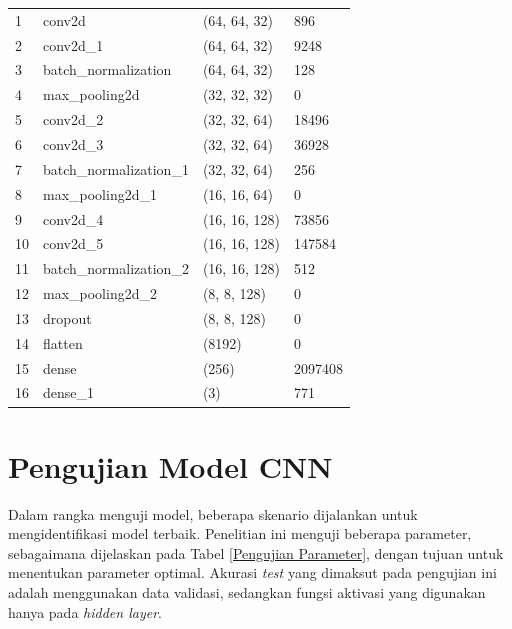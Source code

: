 \begin{table}[H]
\begin{table}[H]
\begin{tabular}{p{1cm}p{4.5cm}p{4cm}p{2.5cm}}
        1 & conv2d                   & (64, 64, 32)   & 896     \\ 
        2 & conv2d\_1                & (64, 64, 32)   & 9248    \\ 
        3 & batch\_normalization     & (64, 64, 32)   & 128     \\ 
        4 & max\_pooling2d           & (32, 32, 32)   & 0       \\ 
        5 & conv2d\_2                & (32, 32, 64)   & 18496   \\ 
        6 & conv2d\_3                & (32, 32, 64)   & 36928   \\ 
        7 & batch\_normalization\_1  & (32, 32, 64)   & 256     \\ 
        8 & max\_pooling2d\_1        & (16, 16, 64)   & 0       \\ 
        9 & conv2d\_4                & (16, 16, 128)  & 73856   \\ 
        10 & conv2d\_5                & (16, 16, 128)  & 147584  \\ 
        11 & batch\_normalization\_2  & (16, 16, 128)  & 512     \\ 
        12 & max\_pooling2d\_2        & (8, 8, 128)    & 0       \\ 
        13 & dropout                  & (8, 8, 128)    & 0       \\ 
        14 & flatten                  & (8192)         & 0       \\ 
        15 & dense                    & (256)          & 2097408 \\ 
        16 & dense\_1                 & (3)            & 771     \\ \hline
        \end{tabular}
    \end{table}





\section{Pengujian Model CNN}

    Dalam rangka menguji model, beberapa skenario dijalankan untuk mengidentifikasi model terbaik. Penelitian ini menguji beberapa parameter, sebagaimana dijelaskan pada Tabel \ref{Pengujian Parameter}, dengan tujuan untuk menentukan parameter optimal.  Akurasi \textit{test} yang dimaksut pada pengujian ini adalah menggunakan data validasi, sedangkan fungsi aktivasi yang digunakan hanya pada \textit{hidden layer}.



\end{table}

